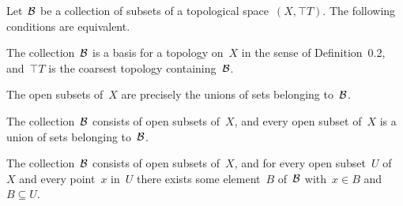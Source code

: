 \begin{proposition}
	\label{characterizations of bases}
	Let~$\mathcal{B}$ be a collection of subsets of a topological space~$(X, \top{T})$.
	The following conditions are equivalent.
	\begin{equivalenceslist}

		\item
			\label{is basis}
			The collection~$\mathcal{B}$ is a basis for a topology on~$X$ in the sense of Definition~0.2, and~$\top{T}$ is the coarsest topology containing~$\mathcal{B}$.

		\item
			\label{open are precisely the unions}
			The open subsets of~$X$ are precisely the unions of sets belonging to~$\mathcal{B}$.

		\item
			\label{is open and every open set is union}
			The collection~$\mathcal{B}$ consists of open subsets of~$X$, and every open subset of~$X$ is a union of sets belonging to~$\mathcal{B}$.

		\item
			\label{is open and every open set contains}
			The collection~$\mathcal{B}$ consists of open subsets of~$X$, and for every open subset~$U$ of~$X$ and every point~$x$ in~$U$ there exists some element~$B$ of~$\mathcal{B}$ with~$x ∈ B$ and~$B ⊆ U$.

	\end{equivalenceslist}
\end{proposition}

